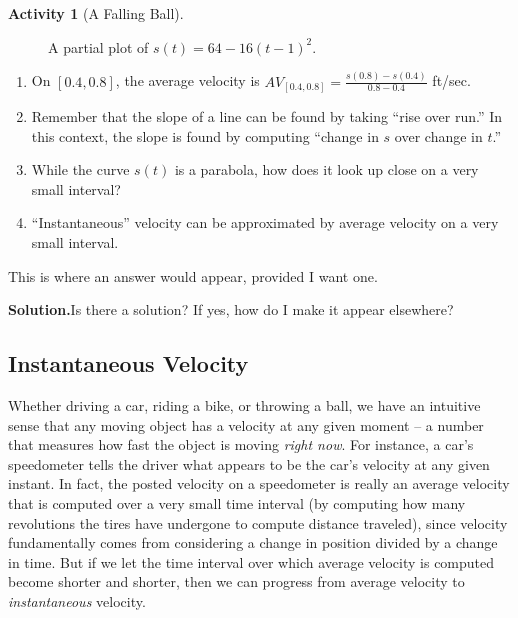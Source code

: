 \documentclass[10pt,]{book}
\theoremstyle{plain}
\theoremstyle{definition}
\theoremstyle{definition}
\theoremstyle{definition}
\theoremstyle{definition}
\newtheorem{activity}[project]{Activity}
\theoremstyle{definition}
\numberwithin{equation}{section}
\begin{document}
\begin{activity}[A Falling Ball]
\begin{enumerate}[label=\alph*]
\begin{figure}
\caption{A partial plot of \(s(t) = 64 - 16(t-1)^2\).\label{F_1.1.Act1}}
\end{figure}
\end{enumerate}
\leavevmode%
\begin{enumerate}
\item\hypertarget{li-12}{}On \([0.4,0.8]\), the average velocity is \(AV_{[0.4,0.8]} = \frac{s(0.8)-s(0.4)}{0.8-0.4}\) ft/sec.%
\item\hypertarget{li-13}{}Remember that the slope of a line can be found by taking ``rise over run.''  In this context, the slope is found by computing ``change in \(s\) over change in \(t\).''%
\item\hypertarget{li-14}{}While the curve \(s(t)\) is a parabola, how does it look up close on a very small interval?%
\item\hypertarget{li-15}{}``Instantaneous'' velocity can be approximated by average velocity on a very small interval.%
\end{enumerate}
 This is where an answer would appear, provided I want one. %
\par\medskip\noindent%
\textbf{Solution.}\quad  Is there a solution?  If yes, how do I make it appear elsewhere? %
\end{activity}
\typeout{************************************************}
\typeout{************************************************}
\subsection[{Instantaneous Velocity}]{Instantaneous Velocity}\label{subsection-3}

Whether driving a car, riding a bike, or throwing a ball, we have an intuitive sense that any moving object has a velocity at any given moment -- a number that measures how fast the object is moving \emph{right now}. For instance, a car's speedometer tells the driver what appears to be the car's velocity at any given instant. In fact, the posted velocity on a speedometer is really an average velocity that is computed over a very small time interval (by computing how many revolutions the tires have undergone to compute distance traveled), since velocity fundamentally comes from considering a change in position divided by a change in time. But if we let the time interval over which average velocity is computed become shorter and shorter, then we can progress from average velocity to \emph{instantaneous} velocity.
%
\par
\end{document}

